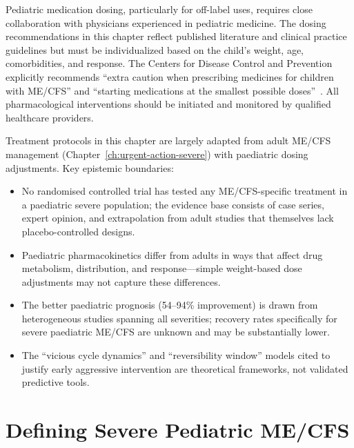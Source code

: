 \begin{practicalwarning}
Pediatric medication dosing, particularly for off-label uses, requires close collaboration with physicians experienced in pediatric medicine. The dosing recommendations in this chapter reflect published literature and clinical practice guidelines but must be individualized based on the child's weight, age, comorbidities, and response. The Centers for Disease Control and Prevention explicitly recommends ``extra caution when prescribing medicines for children with ME/CFS'' and ``starting medications at the smallest possible doses''~\cite{CDC2024pediatric}. All pharmacological interventions should be initiated and monitored by qualified healthcare providers.
\end{practicalwarning}

\begin{limitation}
Treatment protocols in this chapter are largely adapted from adult ME/CFS management (Chapter~\ref{ch:urgent-action-severe}) with paediatric dosing adjustments. Key epistemic boundaries:
\begin{itemize}
    \item No randomised controlled trial has tested any ME/CFS-specific treatment in a paediatric severe population; the evidence base consists of case series, expert opinion, and extrapolation from adult studies that themselves lack placebo-controlled designs.
    \item Paediatric pharmacokinetics differ from adults in ways that affect drug metabolism, distribution, and response---simple weight-based dose adjustments may not capture these differences.
    \item The better paediatric prognosis (54--94\% improvement) is drawn from heterogeneous studies spanning all severities; recovery rates specifically for severe paediatric ME/CFS are unknown and may be substantially lower.
    \item The ``vicious cycle dynamics'' and ``reversibility window'' models cited to justify early aggressive intervention are theoretical frameworks, not validated predictive tools.
\end{itemize}
\end{limitation}

\section{Defining Severe Pediatric ME/CFS}
\label{sec:ped-severe-definition}

